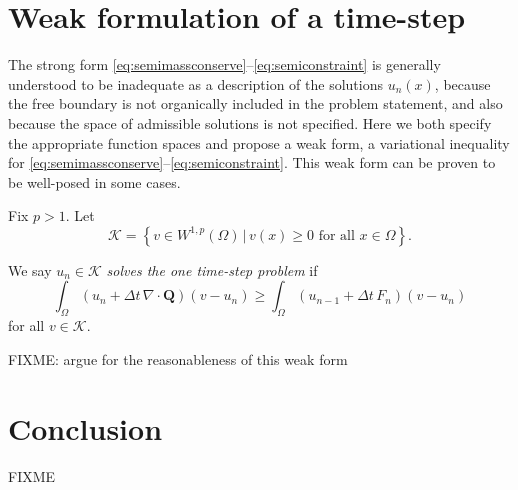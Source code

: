\documentclass[final,leqno,onefignum,onetabnum]{siamltex1213bueler}
\newcommand\bQ{\mathbf{Q}}
\newcommand{\Div}{\nabla\cdot}
\begin{document}
\section{Weak formulation of a time-step}  The strong form \eqref{eq:semimassconserve}--\eqref{eq:semiconstraint} is generally understood to be inadequate as a description of the solutions $u_n(x)$, because the free boundary is not organically included in the problem statement, and also because the space of admissible solutions is not specified.  Here we both specify the appropriate function spaces and propose a weak form, a variational inequality \cite{Friedman,KinderlehrerStampacchia} for \eqref{eq:semimassconserve}--\eqref{eq:semiconstraint}.  This weak form can be proven to be well-posed in some cases.

\begin{definition}  Fix $p>1$.  Let
    $$\mathcal{K} = \left\{v \in W^{1,p}(\Omega) \,\big|\, v(x) \ge 0 \text{ for all } x \in \Omega\right\}.$$
\end{definition}

\begin{definition}  We say $u_n \in \mathcal{K}$ \emph{solves the one time-step problem} if 
    $$\int_\Omega \left(u_n + \Delta t\,\Div \bQ\right)(v-u_n) \ge \int_\Omega \left(u_{n-1} + \Delta t\,F_n\right)(v-u_n)$$
for all $v\in\mathcal{K}$.
\end{definition}

FIXME: argue for the reasonableness of this weak form

\section{Conclusion}  FIXME





\end{document}
